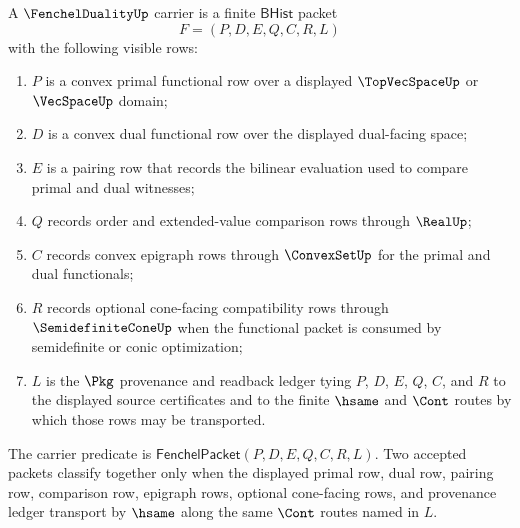 \begin{definition}
\label{def:fenchelduality-carrier}
A $\FenchelDualityUp$ carrier is a finite $\mathsf{BHist}$ packet
$$
F=(P,D,E,Q,C,R,L)
$$
with the following visible rows:
\begin{enumerate}
\item $P$ is a convex primal functional row over a displayed $\TopVecSpaceUp$ or $\VecSpaceUp$ domain;
\item $D$ is a convex dual functional row over the displayed dual-facing space;
\item $E$ is a pairing row that records the bilinear evaluation used to compare primal and dual witnesses;
\item $Q$ records order and extended-value comparison rows through $\RealUp$;
\item $C$ records convex epigraph rows through $\ConvexSetUp$ for the primal and dual functionals;
\item $R$ records optional cone-facing compatibility rows through $\SemidefiniteConeUp$ when the functional packet is consumed by semidefinite or conic optimization;
\item $L$ is the $\Pkg$ provenance and readback ledger tying $P$, $D$, $E$, $Q$, $C$, and $R$ to the displayed source certificates and to the finite $\hsame$ and $\Cont$ routes by which those rows may be transported.
\end{enumerate}
The carrier predicate is $\mathsf{FenchelPacket}(P,D,E,Q,C,R,L)$. Two accepted packets classify together only when the displayed primal row, dual row, pairing row, comparison row, epigraph rows, optional cone-facing rows, and provenance ledger transport by $\hsame$ along the same $\Cont$ routes named in $L$.
\end{definition}

